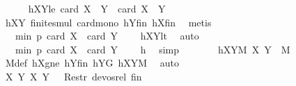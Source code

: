 \begin{isabellebody}
\ \ \ \ \isamarkupfalse%
\ hXY{}le{\isacharcolon}{\kern0pt}\ {\isachardoublequoteopen}card\ {\isacharparenleft}{\kern0pt}{\isacharquery}{\kern0pt}X{}\ {\isasymcdots}\ {\isacharquery}{\kern0pt}Y{}{\isacharparenright}{\kern0pt}\ {\isasymle}\ card\ {\isacharparenleft}{\kern0pt}X\ {\isasymcdots}\ Y{\isacharparenright}{\kern0pt}{\isachardoublequoteclose}\ \isamarkupfalse%
\ hXY{}\ finite{\isacharunderscore}{\kern0pt}smul\ card{\isacharunderscore}{\kern0pt}mono\ hYfin\ hXfin\ \isamarkupfalse%
\ metis\isanewline
\ \ \ \ \isamarkupfalse%
\ \isamarkupfalse%
\ {\isachardoublequoteopen}{\isachardot}{\kern0pt}{\isachardot}{\kern0pt}{\isachardot}{\kern0pt}\ {\isacharless}{\kern0pt}\ min\ p\ {\isacharparenleft}{\kern0pt}card\ X\ {\isacharplus}{\kern0pt}\ card\ Y\ {\isacharminus}{\kern0pt}\ {}{\isacharparenright}{\kern0pt}{\isachardoublequoteclose}\ \isamarkupfalse%
\ hXYlt\ \isamarkupfalse%
\ auto\isanewline
\ \ \ \ \isamarkupfalse%
\ \isamarkupfalse%
\ {\isachardoublequoteopen}{\isachardot}{\kern0pt}{\isachardot}{\kern0pt}{\isachardot}{\kern0pt}\ {\isasymle}\ min\ p\ {\isacharparenleft}{\kern0pt}card\ {\isacharquery}{\kern0pt}X{}\ {\isacharplus}{\kern0pt}\ card\ {\isacharquery}{\kern0pt}Y{}\ {\isacharminus}{\kern0pt}\ {}{\isacharparenright}{\kern0pt}{\isachardoublequoteclose}\ \isamarkupfalse%
\ h\ \isamarkupfalse%
\ simp\isanewline
\ \ \ \ \isamarkupfalse%
\ \isamarkupfalse%
\ hXY{}M{\isacharcolon}{\kern0pt}\ {\isachardoublequoteopen}{\isacharparenleft}{\kern0pt}{\isacharquery}{\kern0pt}X{}{\isacharcomma}{\kern0pt}\ {\isacharquery}{\kern0pt}Y{}{\isacharparenright}{\kern0pt}\ {\isasymin}\ M{\isachardoublequoteclose}\ \isamarkupfalse%
\ M{\isacharunderscore}{\kern0pt}def\ hXgne\ hY{}fin\ hY{}G\ hXYM\ \isamarkupfalse%
\ auto\isanewline
\ \ \ \ \isamarkupfalse%
\ \isamarkupfalse%
\ {\isachardoublequoteopen}{\isacharparenleft}{\kern0pt}{\isacharparenleft}{\kern0pt}{\isacharquery}{\kern0pt}X{}{\isacharcomma}{\kern0pt}\ {\isacharquery}{\kern0pt}Y{}{\isacharparenright}{\kern0pt}{\isacharcomma}{\kern0pt}\ {\isacharparenleft}{\kern0pt}X{\isacharcomma}{\kern0pt}\ Y{\isacharparenright}{\kern0pt}{\isacharparenright}{\kern0pt}\ {\isasymin}\ \ Restr\ devos{\isacharunderscore}{\kern0pt}rel\ {\isacharquery}{\kern0pt}fin{\isachardoublequoteclose}\ \isamarkupfalse%

\end{isabellebody}
